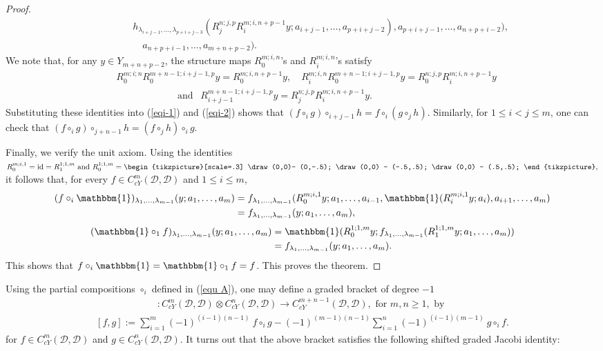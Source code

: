 \documentclass[a4paper,reqno,10pt]{amsart}
\theoremstyle{plain}
\theoremstyle{definition}
\theoremstyle{remark}
\newcommand{\D}{\mathcal{D}}
\newcommand{\la}{\lambda}
\begin{document}
\begin{proof}
\begin{align}
    & \qquad \quad h_{\la_{i+j-1}, \ldots , \la _{p+i+j-3}}(R_{j}^{n;j,p}R_{i}^{m;i,n+p-1}y; a_{i+j-1}, \ldots, a_{p+i+j-2}),a_{p+i+j-1}, \ldots , a_{n+p+i-2} \big), \nonumber \\
    & \qquad \qquad a_{n+p+i-1}, \ldots  , a_{m+n+p-2} \big).
  \end{align} 
  We note that, for any $y \in Y_{m+n+p-2}$, the structure maps $R_0^{m;i, n}$'s and $R_i^{m;i, n}$'s satisfy
  \begin{align*}
 &R_{0}^{m;i;n}R_{0}^{m+n-1;i+j-1,p}y= R_{0}^{m;i,n+p-1}y, \quad
  R_{i}^{m;i,n}  R_{0}^{m+n-1;i+j-1,p}y = R_{0}^{n;j,p} R_{i}^{m;i,n+p-1}y \\ & \qquad \qquad \qquad \text{ and } ~~ R_{i+j-1}^{m+n-1;i+j-1,p}y= R_{j}^{n;j,p}R_{i}^{m;i,n+p-1}y.
\end{align*}
Substituting these identities into (\ref{eqi-1}) and (\ref{eqi-2}) shows that $(f \circ_i g) \circ_{i+j-1} h = f \circ_i (g \circ_j h)$. Similarly, for $1 \leq i < j \leq m$, one can check that $(f \circ_i g) \circ_{j+n-1} h = (f \circ_j h ) \circ_i g$.

Finally, we verify the unit axiom. Using the identities $R_{0}^{m;i,1}=\mathrm{id}=R_{1}^{1;1,m}
 \text{ and } 
R_{0}^{1;1,m}=
\begin{tikzpicture}[scale=.3]
\draw (0,0)-- (0,-.5);
\draw (0,0) -- (-.5,.5);
\draw (0,0) -- (.5,.5);
\end{tikzpicture},$ it follows that, for every $f\in C_{cY}^{m}(\D,\D)$ and $1\leq i\leq m$,
\begin{align*}
(f\circ_i\mathbbm{1})_{\la_1,\ldots,\la_{m-1}}
(y;a_1,\ldots,a_m)
&=
f_{\la_1,\ldots,\la_{m-1}}
(
R_0^{m;i,1}y;
a_1,\ldots,a_{i-1},
\mathbbm{1}(R_i^{m;i,1}y;a_i),
a_{i+1},\ldots,a_m
)\\
&=
f_{\la_1,\ldots,\la_{m-1}}
(y;a_1,\ldots,a_m),
\end{align*}
\begin{align*}
(\mathbbm{1}\circ_1f)_{\la_1,\ldots,\la_{m-1}}
(y;a_1,\ldots,a_m)
&=
\mathbbm{1}
(
R_0^{1;1,m}y;
f_{\la_1,\ldots,\la_{m-1}}
(R_1^{1;1,m}y;a_1,\ldots,a_m)
)\\
&=
f_{\la_1,\ldots,\la_{m-1}}
(y;a_1,\ldots,a_m).
\end{align*}
This shows that $f\circ_i\mathbbm{1}
=
\mathbbm{1}\circ_1f
=
f$. This proves the theorem.
\end{proof}

Using the partial compositions $\circ_i$ defined in (\ref{equ A}), one may define a graded bracket of degree $-1$ 
\begin{align*}
[ ~,~]:C_{cY}^{m}(\D,\D) \otimes C_{cY}^{n}(\D,\D) \longrightarrow C_{cY}^{m+n-1}(\D,\D), \text{ for } m,n \geq 1, \text{ by }
\end{align*}
\begin{align} \label{brac-form}
    [f,g] := \sum_{i =1}^{m} (-1)^{(i-1)(n-1)} ~ \! f \circ_i g - (-1)^{(m-1)(n-1)} \sum_{i=1}^{n} (-1)^{(i-1)(m-1)} ~ \! g \circ_i f.
\end{align}
for $f \in C_{cY}^{m}(\D,\D)$ and $g \in C_{cY}^{n}(\D,\D)$.
It turns out that \cite{gers-ring,gers-voro} the above bracket satisfies the following shifted graded Jacobi identity:
\end{document}
